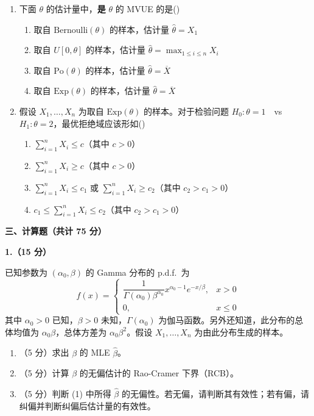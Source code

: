 \documentclass[12pt,a4paper]{ctexart}
\newcommand{\question}[2]{\bigskip\noindent\textbf{#1}\par\nobreak\medskip}
\begin{document}
\begin{enumerate}[label=\arabic*.,leftmargin=2.2em]
  \item 下面 $\theta$ 的估计量中，\textbf{是} $\theta$ 的 MVUE 的是\hfill(\underline{\hspace{1.2cm}})
  \begin{enumerate}[label=\Alph*.,leftmargin=2.0em]
    \item 取自 $\mathrm{Bernoulli}(\theta)$ 的样本，估计量 $\widehat{\theta}=X_{1}$
    \item 取自 $U[0,\theta]$ 的样本，估计量 $\widehat{\theta}=\max_{1\le i\le n}X_{i}$
    \item 取自 $\mathrm{Po}(\theta)$ 的样本，估计量 $\widehat{\theta}=\overline{X}$
    \item 取自 $\mathrm{Exp}(\theta)$ 的样本，估计量 $\widehat{\theta}=\overline{X}$
  \end{enumerate}

  \item 假设 $X_{1},\ldots,X_{n}$ 为取自 $\mathrm{Exp}(\theta)$ 的样本。对于检验问题 $H_{0}:\theta=1$\ \ vs\ \ $H_{1}:\theta=2$，最优拒绝域应该形如\hfill(\underline{\hspace{1.2cm}})
  \begin{enumerate}[label=\Alph*.,leftmargin=2.0em]
    \item $\sum_{i=1}^{n}X_{i}\le c$（其中 $c>0$）
    \item $\sum_{i=1}^{n}X_{i}\ge c$（其中 $c>0$）
    \item $\sum_{i=1}^{n}X_{i}\le c_{1}$ 或 $\sum_{i=1}^{n}X_{i}\ge c_{2}$（其中 $c_{2}>c_{1}>0$）
    \item $c_{1}\le\sum_{i=1}^{n}X_{i}\le c_{2}$（其中 $c_{2}>c_{1}>0$）
  \end{enumerate}
\end{enumerate}

\bigskip
\begin{center}\textbf{三、计算题（共计 75 分）}\end{center}

\question{1.（15 分）}{15}
已知参数为 $(\alpha_{0},\beta)$ 的 Gamma 分布的 p.d.f.\ 为
\[ f(x)=\begin{cases}
\dfrac{1}{\Gamma(\alpha_{0})\beta^{\alpha_{0}}}x^{\alpha_{0}-1}e^{-x/\beta}, & x>0\\[6pt]
0, & x\le 0
\end{cases} \]
其中 $\alpha_{0}>0$ 已知，$\beta>0$ 未知，$\Gamma(\alpha_{0})$ 为伽马函数。另外还知道，此分布的总体均值为 $\alpha_{0}\beta$，总体方差为 $\alpha_{0}\beta^{2}$。假设 $X_{1},\ldots,X_{n}$ 为由此分布生成的样本。
\begin{enumerate}[label=(\arabic*),leftmargin=2.4em]
  \item （5 分）求出 $\beta$ 的 MLE $\widehat{\beta}$。
  \item （5 分）计算 $\beta$ 的无偏估计的 Rao-Cramer 下界（RCB）。
  \item （5 分）判断 (1) 中所得 $\widehat{\beta}$ 的无偏性。若无偏，请判断其有效性；若有偏，请纠偏并判断纠偏后估计量的有效性。
\end{enumerate}
\end{document}
